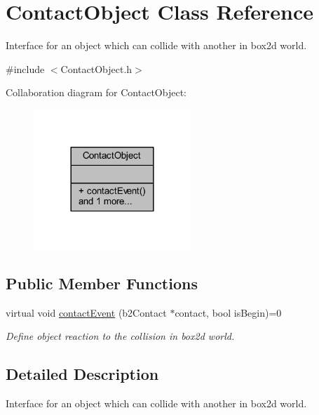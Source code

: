 \hypertarget{class_contact_object}{}\section{Contact\+Object Class Reference}
\label{class_contact_object}


Interface for an object which can collide with another in box2d world.  




{\ttfamily \#include $<$Contact\+Object.\+h$>$}



Collaboration diagram for Contact\+Object\+:\nopagebreak
\begin{figure}[H]
\begin{center}
\leavevmode
\includegraphics[width=168pt]{class_contact_object__coll__graph}
\end{center}
\end{figure}
\subsection*{Public Member Functions}
\begin{DoxyCompactItemize}
\item 
virtual void \hyperlink{class_contact_object_a53d2dfc1d9c2821e9c62e80ce62a6435}{contact\+Event} (b2\+Contact $\ast$contact, bool is\+Begin)=0
\begin{DoxyCompactList}\small\item\em Define object reaction to the collision in box2d world. \end{DoxyCompactList}\end{DoxyCompactItemize}


\subsection{Detailed Description}
Interface for an object which can collide with another in box2d world. 

